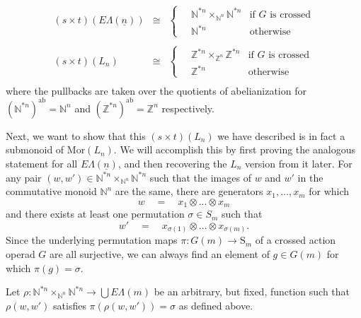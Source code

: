 \documentclass{amsbook} %
\newcommand{\EL}{E\Lambda}
\newcommand{\ELn}{E\Lambda(\underline{n})}
\numberwithin{section}{chapter}
\begin{document}
\begin{cor} \label{stpullback}
\[\begin{array}{rll} 
		(s \times t)(\ELn) & \cong & \begin{cases}
								\quad \mathbb{N}^{\ast n} \times_{\mathbb{N}^n} \mathbb{N}^{\ast n} & \text{if $G$ is crossed}\\
								\quad \mathbb{N}^{\ast n} & \text{otherwise}
							\end{cases} \\
		& & \\
		(s \times t)(L_n) & \cong & \begin{cases}
								\quad \mathbb{Z}^{\ast n} \times_{\mathbb{Z}^n} \mathbb{Z}^{\ast n}  & \text{if $G$ is crossed}\\
								\quad \mathbb{Z}^{\ast n} & \text{otherwise}
							\end{cases} \\
		\end{array}
\]
where the pullbacks are taken over the quotients of abelianization for $(\mathbb{N}^{\ast n})^{\mathrm{ab}} = \mathbb{N}^n$ and $(\mathbb{Z}^{\ast n})^{\mathrm{ab}} = \mathbb{Z}^n$ respectively.
\end{cor}

Next, we want to show that this $(s \times t)(L_n)$ we have described is in fact a submonoid of $\mathrm{Mor}(L_n)$.  We will accomplish this  by first proving the analogous statement for all $\ELn$, and then recovering the $L_n$ version from it later.  For any pair $(w, w') \in \mathbb{N}^{\ast n} \times_{\mathbb{N}^n} \mathbb{N}^{\ast n}$ such that the images of $w$ and $w'$ in the commutative monoid $\mathbb{N}^n$ are the same, there are generators $x_1, ..., x_m$ for which 
\[ w \quad = \quad x_1 \otimes ... \otimes x_m \]
and there exists at least one permutation $\sigma \in S_m$ such that
\[ w' \quad = \quad x_{\sigma(1)} \otimes ... \otimes x_{\sigma(m)}. \]
Since the underlying permutation maps $\pi : G(m) \to \mathrm{S}_m$ of a crossed action operad $G$ are all surjective, we can always find an element of $g \in G(m)$ for which $\pi(g) = \sigma$. 

\begin{nota}\label{rho_ww'}
Let $\rho:\mathbb{N}^{\ast n} \times_{\mathbb{N}^n} \mathbb{N}^{\ast n} \to \bigcup \EL(m)$ be an arbitrary, but fixed, function such that $\rho(w,w')$ satisfies $\pi(\rho(w,w')) = \sigma$ as defined above.
\end{nota}
\end{document}

